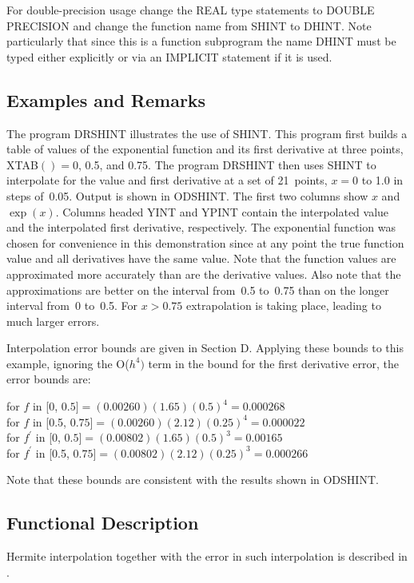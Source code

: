 \documentclass[twoside]{MATH77}
\begin{document}
For double-precision usage change the REAL type statements to DOUBLE
PRECISION and change the function name from SHINT to DHINT. Note
particularly that since this is a function subprogram the name DHINT
must be typed either explicitly or via an IMPLICIT statement if it is used.

\subsection{Examples and Remarks}

The program DRSHINT illustrates the use of SHINT. This program first builds
a table of values of the exponential function and its first derivative at
three points, XTAB$()=0$, 0.5, and 0.75. The program DRSHINT then uses SHINT
to interpolate for the value and first derivative at a set of 21~points, $x=0
$ to 1.0 in steps of~0.05. Output is shown in ODSHINT. The first two columns
show $x$ and $\exp (x)$. Columns headed YINT and YPINT contain the
interpolated value and the interpolated first derivative, respectively. The
exponential function was chosen for convenience in this demonstration since
at any point the true function value and all derivatives have the same
value. Note that the function values are approximated more accurately than
are the derivative values. Also note that the approximations are better on
the interval from~0.5 to~0.75 than on the longer interval from~0 to~0.5. For
$x>0.75$ extrapolation is taking place, leading to much larger errors.

Interpolation error bounds are given in Section D. Applying these bounds to
this example, ignoring the O($h^4)$ term in the bound for the first
derivative error, the error bounds are:
\begin{tabbing}
 for $f$ in [0, $0.5] = (0.00260)(1.65)(0.5)^4 = 0.000268$\\
 for $f$ in [0.5, $0.75] = (0.00260)(2.12)(0.25)^4 = 0.000022$\\
 for $f^{\prime}$ in [0, $0.5] = (0.00802)(1.65)(0.5)^3 = 0.00165$\\
 for $f^{\prime}$ in [0.5, $0.75] = (0.00802)(2.12)(0.25)^3 = 0.000266$
\end{tabbing}
Note that these bounds are consistent with the results shown in ODSHINT.

\subsection{Functional Description}

Hermite interpolation together with the error in such interpolation is
described in \cite[pp.~314--317]{Hildebrand:1956:INA}.
\end{document}
